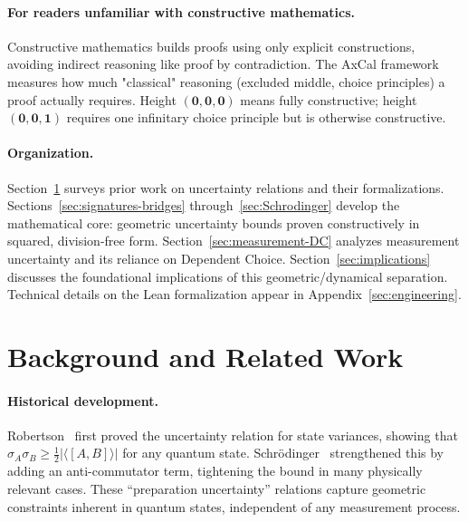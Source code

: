 \documentclass[11pt]{article}
\theoremstyle{plain}
\theoremstyle{definition}
\theoremstyle{remark}
\begin{document}
\paragraph{For readers unfamiliar with constructive mathematics.}
Constructive mathematics builds proofs using only explicit constructions, avoiding indirect reasoning like proof by contradiction. The AxCal framework measures how much "classical" reasoning (excluded middle, choice principles) a proof actually requires. Height $(\mathbf{0},\mathbf{0},\mathbf{0})$ means fully constructive; height $(\mathbf{0},\mathbf{0},\mathbf{1})$ requires one infinitary choice principle but is otherwise constructive.

\paragraph{Organization.}
Section~\ref{sec:related} surveys prior work on uncertainty relations and their formalizations.
Sections~\ref{sec:signatures-bridges} through~\ref{sec:Schrodinger} develop the mathematical core: geometric uncertainty bounds proven constructively in squared, division-free form.
Section~\ref{sec:measurement-DC} analyzes measurement uncertainty and its reliance on Dependent Choice.
Section~\ref{sec:implications} discusses the foundational implications of this geometric/dynamical separation.
Technical details on the Lean formalization appear in Appendix~\ref{sec:engineering}.

\section{Background and Related Work}
\label{sec:related}

\paragraph{Historical development.}
Robertson~\cite{Robertson1929} first proved the uncertainty relation for state variances, showing that $\sigma_A \sigma_B \geq \frac{1}{2}|\langle[A,B]\rangle|$ for any quantum state. Schrödinger~\cite{Schrodinger1930} strengthened this by adding an anti-commutator term, tightening the bound in many physically relevant cases. These ``preparation uncertainty'' relations capture geometric constraints inherent in quantum states, independent of any measurement process.
\end{document}

